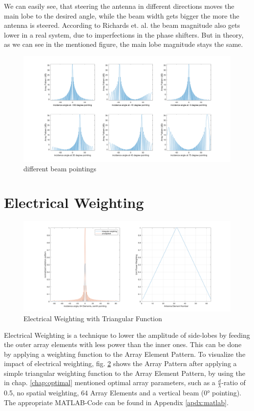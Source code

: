We can easily see, that steering the antenna in different directions moves the main lobe to the desired angle, while the beam width gets bigger the more the antenna is steered. According to Richards et. al.\citep{richards2010principles} the beam magnitude also gets lower in a real system, due to imperfections in the phase shifters. But in theory, as we can see in the mentioned figure, the main lobe magnitude stays the same.

\begin{figure}[h!]
	\centering
	\includegraphics[width=\textwidth]{images/variablePointing}
	\caption{different beam pointings}
	\label{fig:pointing}
\end{figure}


\section{Electrical Weighting}
\begin{figure}[h!]
	\centering
	\includegraphics[width=\textwidth]{images/triangularElectricalWeight}
		\caption{Electrical Weighting with Triangular Function}
	\label{fig:electricalWeight}
\end{figure}

Electrical Weighting is a technique to lower the amplitude of side-lobes by feeding the outer array elements with less power than the inner ones. This can be done by applying a weighting function to the Array Element Pattern.
To visualize the impact of electrical weighting, fig. \ref{fig:electricalWeight} shows the Array Pattern after applying a simple triangular weighting function to the Array Element Pattern, by using the in chap. \ref{chap:optimal} mentioned optimal array parameters, such as a $\frac{d}{\lambda}$-ratio of 0.5, no spatial weighting, 64 Array Elements and a vertical beam (0° pointing).
The appropriate MATLAB-Code can be found in Appendix \ref{apdx:matlab}.

